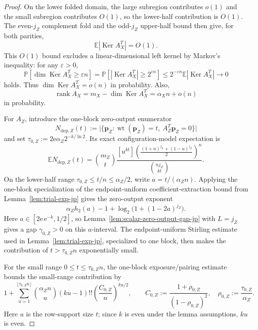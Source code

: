 \documentclass[11pt]{article}
\theoremstyle{definition}
\newcommand{\EE}{\mathbb E}
\newcommand{\PP}{\mathbb P}
\newcommand{\rank}{\operatorname{rank}}
\newcommand{\wt}{\operatorname{wt}}
\newcommand{\Ker}{\operatorname{Ker}}
\newcommand{\bp}{\mathbf p}
\newcommand{\h}{h_2}
\begin{document}
\begin{proof}
On the lower folded domain, the large subregion contributes \(o(1)\) and the small subregion contributes \(O(1)\), so the lower-half contribution is \(O(1)\). The even-\(j_Z\) complement fold and the odd-\(j_Z\) upper-half bound then give, for both parities,
\begin{equation*}
\EE |\Ker A_X^T| = O(1).
\end{equation*}
This \(O(1)\) bound excludes a linear-dimensional left kernel by Markov's inequality: for any \(\varepsilon>0\),
\begin{equation*}
\PP\!\left[\dim\Ker A_X^T\ge \varepsilon n\right]
=
\PP\!\left[|\Ker A_X^T|\ge 2^{\varepsilon n}\right]
\le
2^{-\varepsilon n}\EE |\Ker A_X^T|
\to 0
\end{equation*}
holds.
Thus \(\dim\Ker A_X^T=o(n)\) in probability. Also,
\begin{equation*}
\rank A_X = m_X-\dim\Ker A_X^T = \alpha_X n + o(n)
\end{equation*}
in probability.

For \(A_Z\), introduce the one-block zero-output enumerator
\[
N_{\mathrm{dep},Z}(t)
:=
\bigl|\{\bp_Z:\wt(\bp_Z)=t,\ A_Z^T\bp_Z=0\}\bigr|
\]
and set \(\tau_{0,Z}:=2\mathrm{e}\alpha_Z2^{-k/\ln2}\). Its exact configuration-model expectation is
\[
\EE N_{\mathrm{dep},Z}(t)
=
\binom{m_Z}{t}
\frac{[u^{kt}]\left(\frac{(1+u)^{j_Z}+(1-u)^{j_Z}}{2}\right)^n}
{\binom{n j_Z}{kt}}.
\]
On the lower-half range \(\tau_{0,Z}\le t/n\le \alpha_Z/2\), write \(a=t/(\alpha_Z n)\). Applying the one-block specialization of the endpoint-uniform coefficient-extraction bound from Lemma~\ref{lem:trial-exp-jp} gives the zero-output exponent
\[
\alpha_Z\h(a)-1+\log_2\!\bigl(1+(1-2a)^{j_Z}\bigr).
\]
Here \(a\in[2\mathrm{e}\,\mathrm{e}^{-k},1/2]\), so Lemma~\ref{lem:scalar-zero-output-gap-jp} with \(L=j_Z\) gives a gap \(\gamma_{0,Z}>0\) on this \(a\)-interval. The endpoint-uniform Stirling estimate used in Lemma~\ref{lem:trial-exp-jp}, specialized to one block, then makes the contribution of \(t>\tau_{0,Z}n\) exponentially small.

For the small range \(0\le t\le\tau_{0,Z}n\), the one-block exposure/pairing estimate bounds the small-range contribution by
\[
1+\sum_{u=1}^{\lfloor\tau_{0,Z}n\rfloor}
\binom{\alpha_Z n}{u}(ku-1)!!
\left(\frac{C_{0,Z}}{n}\right)^{ku/2},
\qquad
C_{0,Z}:=\frac{1+\rho_{0,Z}}{(1-\rho_{0,Z})^2},
\quad
\rho_{0,Z}:=\frac{\tau_{0,Z}}{\alpha_Z}.
\]
Here \(u\) is the row-support size \(t\); since \(k\) is even under the lemma assumptions, \(ku\) is even.


\end{proof}
\end{document}
